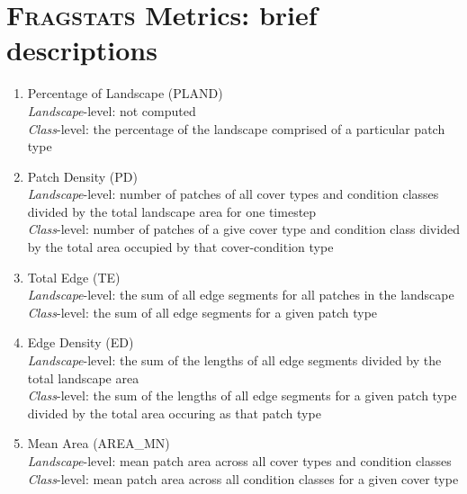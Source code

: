\chapter{\textsc{Fragstats} Metrics: brief descriptions}
\label{app:metricdescriptions}
\begin{enumerate}
	\item Percentage of Landscape (PLAND)\\
	\emph{Landscape}-level: not computed\\
	\emph{Class}-level: the percentage of the landscape comprised of a particular patch type\\
	
	
	\item Patch Density (PD)\\
	\emph{Landscape}-level: number of patches of all cover types and condition classes divided by the total landscape area for one timestep\\
	\emph{Class}-level: number of patches of a give cover type and condition class divided by the total area occupied by that cover-condition type \\

	\item Total Edge (TE) \\
	\label{item:TE}
	\emph{Landscape}-level: the sum of all edge segments for all patches in the landscape      \\
	\emph{Class}-level: the sum of all edge segments for a given patch type        \\
	
	\item Edge Density (ED) \\
	\label{item:ED}
	\emph{Landscape}-level: the sum of the lengths of all edge segments divided by the total landscape area\\	
	\emph{Class}-level: the sum of the lengths of all edge segments for a given patch type divided by the total area occuring as that patch type\\
	
	\item Mean Area (AREA\_MN)\\
	\emph{Landscape}-level:  mean patch area across all cover types and condition classes\\
	\emph{Class}-level:  mean patch area across all condition classes for a given cover type\\
	

\end{enumerate}
